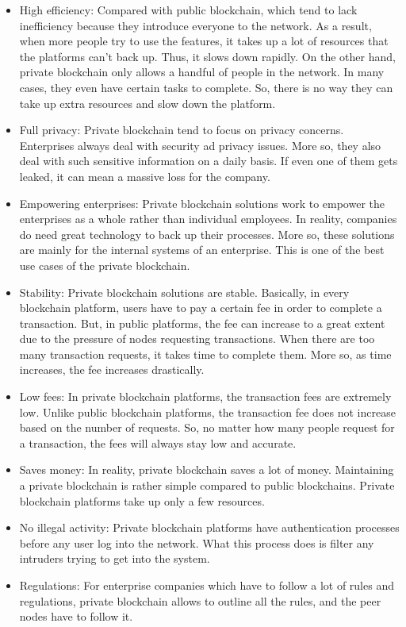 \begin{itemize}
\item High efficiency: Compared with public blockchain, which tend to lack inefficiency because they introduce everyone to the network. As a result, when more people try to use the features, it takes up a lot of resources that the platforms can’t back up. Thus, it slows down rapidly. On the other hand, private blockchain only allows a handful of people in the network. In many cases, they even have certain tasks to complete. So, there is no way they can take up extra resources and slow down the platform.
\item Full privacy: Private blockchain tend to focus on privacy concerns. Enterprises always deal with security ad privacy issues. More so, they also deal with such sensitive information on a daily basis. If even one of them gets leaked, it can mean a massive loss for the company.
\item Empowering enterprises: Private blockchain solutions work to empower the enterprises as a whole rather than individual employees. In reality, companies do need great technology to back up their processes. More so, these solutions are mainly for the internal systems of an enterprise. This is one of the best use cases of the private blockchain.
\item Stability: Private blockchain solutions are stable. Basically, in every blockchain platform, users have to pay a certain fee in order to complete a transaction. But, in public platforms, the fee can increase to a great extent due to the pressure of nodes requesting transactions. When there are too many transaction requests, it takes time to complete them. More so, as time increases, the fee increases drastically.
\item Low fees: In private blockchain platforms, the transaction fees are extremely low. Unlike public blockchain platforms, the transaction fee does not increase based on the number of requests. So, no matter how many people request for a transaction, the fees will always stay low and accurate.
\item Saves money: In reality, private blockchain saves a lot of money. Maintaining a private blockchain is rather simple compared to public blockchains. Private blockchain platforms take up only a few resources.
\item No illegal activity: Private blockchain platforms have authentication processes before any user log into the network. What this process does is filter any intruders trying to get into the system.
\item Regulations: For enterprise companies which have to follow a lot of rules and regulations, private blockchain allows to outline all the rules, and the peer nodes have to follow it.
\end{itemize}


